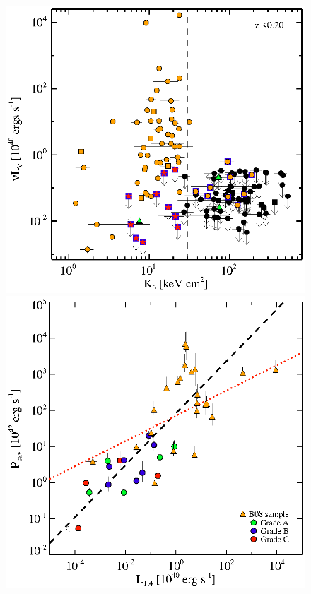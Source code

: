 \documentclass[11pt]{article}
\begin{document}
\begin{center}
  \begin{figure}[htp]
    \begin{minipage}[htp]{0.5\linewidth}
    \includegraphics*[width=\columnwidth, trim=28mm 7mm 40mm 17mm, clip]{k0rad.eps}
    \end{minipage}
    \begin{minipage}[htp]{0.5\linewidth}
      \includegraphics*[width=\textwidth, trim=30mm 5mm 40mm 15mm, clip]{pcav-lrad_1400.eps}
    \end{minipage}


\end{figure}
\end{center}
\end{document}
